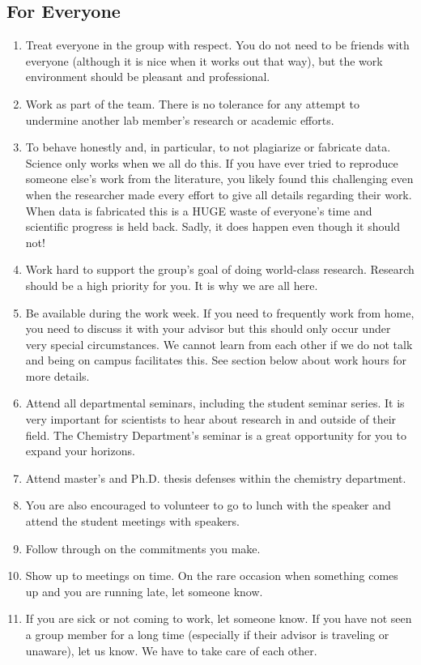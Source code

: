 \documentclass[letterpaper]{article}
\begin{document}
\subsection{For Everyone}
\begin{enumerate}
\item Treat everyone in the group with respect. You do not need to be friends with everyone (although it is nice when it works out that way), but the work environment should be pleasant and professional. 
\item Work as part of the team.  There is  no tolerance for any attempt to undermine another lab member's research or academic efforts.
\item To behave honestly and, in particular, to not plagiarize or fabricate data. Science only works when we all do this. If you have ever tried to reproduce someone else's work from the literature, you likely found this challenging even when the researcher made every effort to give all details regarding their work. When data is fabricated this is a HUGE waste of everyone's time and scientific progress is held back. Sadly, it does happen even though it should not!
\item Work hard to support the group's goal of doing world-class research. Research should be a high priority for you. It is why we are all here. 
\item Be available during the work week. If you need to frequently work from home, you need to discuss it with your advisor but this should only occur under very special circumstances. We cannot learn from each other if we do not talk and being on campus facilitates this. See section below about work hours for more details.
\item Attend all departmental seminars, including the student seminar series. It is very important for scientists to hear about research in and outside of their field. The Chemistry Department's seminar is a great opportunity for you to expand your horizons. 
\item Attend master's and Ph.D. thesis defenses within the chemistry department.
\item You are also encouraged to volunteer to go to lunch with the speaker and attend the student meetings with speakers. 
\item Follow through on the commitments you make.
\item Show up to meetings on time. On the rare occasion when something comes up and you are running late, let someone know.
\item If you are sick or not coming to work, let someone know. If you have not seen a group member for a long time (especially if their advisor is traveling or unaware), let us know. We have to take care of each other.

\end{enumerate}
\end{document}
